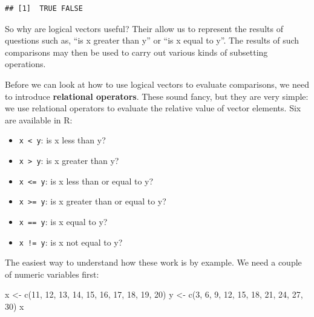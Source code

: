 \documentclass[
]{book}
\newenvironment{Shaded}{\begin{snugshade}}{\end{snugshade}}
\newcommand{\DecValTok}[1]{\textcolor[rgb]{0.00,0.00,0.81}{#1}}
\newcommand{\FunctionTok}[1]{\textcolor[rgb]{0.00,0.00,0.00}{#1}}
\newcommand{\NormalTok}[1]{#1}
\newcommand{\OtherTok}[1]{\textcolor[rgb]{0.56,0.35,0.01}{#1}}
\providecommand{\tightlist}{%
  \setlength{\itemsep}{0pt}\setlength{\parskip}{0pt}}
\begin{document}
\begin{verbatim}
## [1]  TRUE FALSE
\end{verbatim}

So why are logical vectors useful? Their allow us to represent the results of questions such as, ``is x greater than y'' or ``is x equal to y''. The results of such comparisons may then be used to carry out various kinds of subsetting operations.

Before we can look at how to use logical vectors to evaluate comparisons, we need to introduce \textbf{relational operators}. These sound fancy, but they are very simple: we use relational operators to evaluate the relative value of vector elements. Six are available in R:

\begin{itemize}
\tightlist
\item
  \texttt{x\ \textless{}\ y}: is x less than y?
\item
  \texttt{x\ \textgreater{}\ y}: is x greater than y?
\item
  \texttt{x\ \textless{}=\ y}: is x less than or equal to y?
\item
  \texttt{x\ \textgreater{}=\ y}: is x greater than or equal to y?
\item
  \texttt{x\ ==\ y}: is x equal to y?
\item
  \texttt{x\ !=\ y}: is x not equal to y?
\end{itemize}

The easiest way to understand how these work is by example. We need a couple of numeric variables first:

\begin{Shaded}
\begin{Highlighting}[]
\NormalTok{x }\OtherTok{\textless{}{-}} \FunctionTok{c}\NormalTok{(}\DecValTok{11}\NormalTok{, }\DecValTok{12}\NormalTok{, }\DecValTok{13}\NormalTok{, }\DecValTok{14}\NormalTok{, }\DecValTok{15}\NormalTok{, }\DecValTok{16}\NormalTok{, }\DecValTok{17}\NormalTok{, }\DecValTok{18}\NormalTok{, }\DecValTok{19}\NormalTok{, }\DecValTok{20}\NormalTok{)}
\NormalTok{y }\OtherTok{\textless{}{-}} \FunctionTok{c}\NormalTok{(}\DecValTok{3}\NormalTok{, }\DecValTok{6}\NormalTok{, }\DecValTok{9}\NormalTok{, }\DecValTok{12}\NormalTok{, }\DecValTok{15}\NormalTok{, }\DecValTok{18}\NormalTok{, }\DecValTok{21}\NormalTok{, }\DecValTok{24}\NormalTok{, }\DecValTok{27}\NormalTok{, }\DecValTok{30}\NormalTok{)}
\NormalTok{x}
\end{Highlighting}
\end{Shaded}
\end{document}
